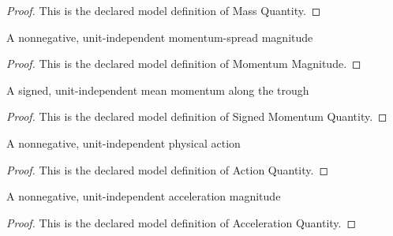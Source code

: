 \begin{proof}
  This is the declared model definition of Mass Quantity.
\end{proof}
\begin{definition}
  \label{def:physics:phyx-mini-0654:phyxminiproblems-problemphyxmini0654-momentummagnitude}
  A nonnegative, unit-independent momentum-spread magnitude
\end{definition}
\begin{proof}
  This is the declared model definition of Momentum Magnitude.
\end{proof}
\begin{definition}
  \label{def:physics:phyx-mini-0654:phyxminiproblems-problemphyxmini0654-signedmomentumquantity}
  A signed, unit-independent mean momentum along the trough
\end{definition}
\begin{proof}
  This is the declared model definition of Signed Momentum Quantity.
\end{proof}
\begin{definition}
  \label{def:physics:phyx-mini-0654:phyxminiproblems-problemphyxmini0654-actionquantity}
  A nonnegative, unit-independent physical action
\end{definition}
\begin{proof}
  This is the declared model definition of Action Quantity.
\end{proof}
\begin{definition}
  \label{def:physics:phyx-mini-0654:phyxminiproblems-problemphyxmini0654-accelerationquantity}
  A nonnegative, unit-independent acceleration magnitude
\end{definition}
\begin{proof}
  This is the declared model definition of Acceleration Quantity.
\end{proof}
